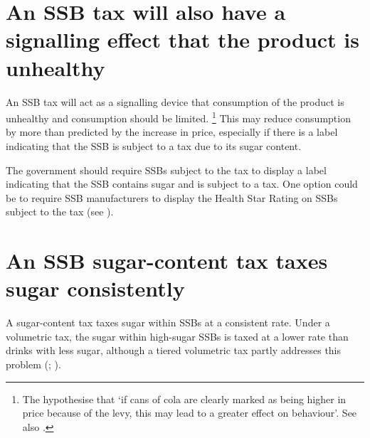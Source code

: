 \documentclass[embargoed]{grattan}
\begin{document}
\section{An SSB tax will also have a signalling effect that the product is unhealthy }\label{an-ssb-tax-will-also-have-a-signalling-effect-that-the-product-is-unhealthy}

An SSB tax will act as a signalling device that consumption of the product is unhealthy and consumption should be limited.%
\footnote{The \textcite{Team2016Sugartaxhow} hypothesise that `if cans of cola are clearly marked as being higher in price because of the levy, this may lead to a greater effect on behaviour'.
See also \textcites{Yang2010Gainweightgoing}{Thow2011Taxingsoftdrinks}{Friedman2012Sugarsweetenedbeverage}{Sassi2013rolefiscalpolicies}{Thow2010effectfiscalpolicy}{Kaplin2011NationalStrategyCombat}{Kaplin2013Usingeconomicpolicy}.} This may reduce consumption by more than predicted by the increase in price, especially if there is a label indicating that the SSB is subject to a tax due to its sugar content.

The government should require SSBs subject to the tax to display a label indicating that the SSB contains sugar and is subject to a tax.
One option could be to require SSB manufacturers to display the Health Star Rating on SSBs subject to the tax (see ).

\section{An SSB sugar-content tax taxes sugar consistently}\label{an-ssb-sugar-content-tax-taxes-sugar-consistently}

A sugar-content tax taxes sugar within SSBs at a consistent rate.
Under a volumetric tax, the sugar within high-sugar SSBs is taxed at a lower rate than drinks with less sugar, although a tiered volumetric tax partly addresses this problem (; ).
\end{document}
